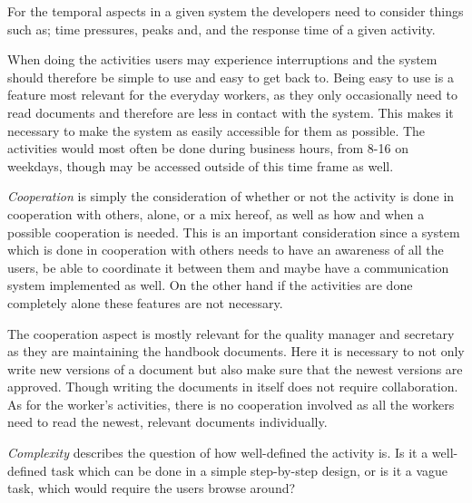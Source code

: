 For the temporal aspects in a given system the developers need to consider things such as; time pressures, peaks and, and the response time of a given activity. \citep{Benyon}

When doing the activities users may experience interruptions and the system should therefore be simple to use and easy to get back to.
Being easy to use is a feature most relevant for the everyday workers, as they only occasionally need to read documents and therefore are less in contact with the system.
This makes it necessary to make the system as easily accessible for them as possible.
The activities would most often be done during business hours, from 8-16 on weekdays, though may be accessed outside of this time frame as well.


\textit{Cooperation} is simply the consideration of whether or not the activity is done in cooperation with others, alone, or a mix hereof, as well as how and when a possible cooperation is needed.
This is an important consideration since a system which is done in cooperation with others needs to have an awareness of all the users, be able to coordinate it between them and maybe have a communication system implemented as well.
On the other hand if the activities are done completely alone these features are not necessary. \citep{Benyon}

The cooperation aspect is mostly relevant for the quality manager and secretary as they are maintaining the handbook documents.
Here it is necessary to not only write new versions of a document but also make sure that the newest versions are approved.
Though writing the documents in itself does not require collaboration.
As for the worker's activities, there is no cooperation involved as all the workers need to read the newest, relevant documents individually.


\textit{Complexity} describes the question of how well-defined the activity is.
Is it a well-defined task which can be done in a simple step-by-step design,
or is it a vague task, which would require the users browse around? \citep{Benyon}

